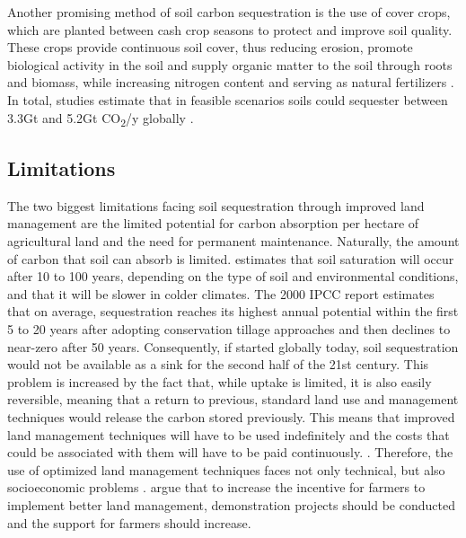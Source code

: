 Another promising method of soil carbon sequestration is the use of cover crops, which are planted between cash crop seasons to protect and improve soil quality. These crops provide continuous soil cover, thus reducing erosion, promote biological activity in the soil and supply organic matter to the soil through roots and biomass, while increasing nitrogen content and serving as natural fertilizers \parencite{Ontl2012SoilStorage,Dipple2021TheSystems}.
In total, studies estimate that in feasible scenarios soils could sequester between 3.3Gt and 5.2Gt CO\textsubscript{2}/y globally \parencite{Bossio2020TheSolutions, Dipple2021TheSystems, NRC2015ClimateSequestration}.

\subsection*{Limitations}
The two biggest limitations facing soil sequestration through improved land management are the limited potential for carbon absorption per hectare of agricultural land and the need for permanent maintenance. Naturally, the amount of carbon that soil can absorb is limited. \textcite{Smith2016SoilTechnologies} estimates that soil saturation will occur after 10 to 100 years, depending on the type of soil and environmental conditions, and that it will be slower in colder climates. The 2000 IPCC report estimates that on average, sequestration reaches its highest annual potential within the first 5 to 20 years after adopting conservation tillage approaches and then declines to near-zero after 50 years. Consequently, if started globally today, soil sequestration would not be available as a sink for the second half of the 21st century.  This problem is increased by the fact that, while uptake is limited, it is also easily reversible, meaning that a return to previous, standard land use and management techniques would release the carbon stored previously. This means that improved land management techniques will have to be used indefinitely and the costs that could be associated with them will have to be paid continuously. \parencite[9]{Smith2016SoilTechnologies}.
Therefore, the use of optimized land management techniques faces not only technical, but also socioeconomic problems \parencite{Dipple2021TheSystems}. \textcite{Zelikova2020LeadingAgriculture} argue that to increase the incentive for farmers to implement better land management, demonstration projects should be conducted and the support for farmers should increase.


